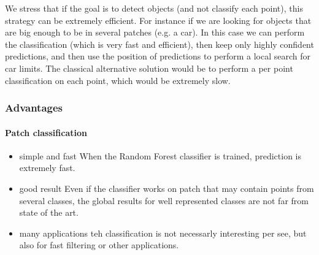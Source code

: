 		We stress that if the goal is to detect objects (and not classify each point), this strategy can be extremely efficient.
		For instance if we are looking for objects that are big enough to be in several patches (e.g. a car).
		In this case we can perform the classification (which is very fast and efficient), then keep only highly confident predictions, and then use the position of predictions to perform a local search for car limits.
		The classical alternative solution would be to perform a per point classification on each point, which would be extremely slow.
		
		
		\subsubsection{Advantages}
		
		
		\paragraph{Patch classification}
		\begin{itemize}
			\item simple and fast
			When the Random Forest classifier is trained, prediction is extremely fast.
			\item good result
			Even if the classifier works on patch that may contain points from several classes, the global results for well represented classes are not far from state of the art.
			\item many applications
			teh classification is not necessarly interesting per see, but also for fast filtering or other applications.
		\end{itemize}
